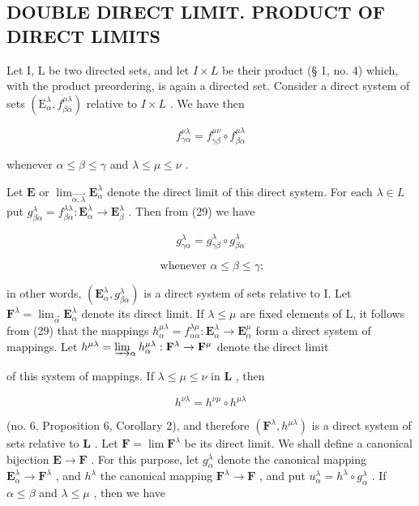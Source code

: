 \subsection{DOUBLE DIRECT LIMIT. PRODUCT OF DIRECT LIMITS}

Let I, L be two directed sets, and let \(I \times L\) be their product (§ 1, no. 4) which, with the product preordering, is again a directed set. Consider a direct system of sets \((\mathrm{E}_{\alpha}^{\lambda}, f_{\beta\alpha}^{\mu\lambda})\) relative to \(I \times L\) . We have then

\[
f _ {\gamma \alpha} ^ {\nu \lambda} = f _ {\gamma \beta} ^ {\mu \nu} \circ f _ {\beta \alpha} ^ {\mu \lambda}\tag{29}
\]

whenever \(\alpha \leqslant \beta \leqslant \gamma\) and \(\lambda \leqslant \mu \leqslant \nu\) .

Let \(\mathbf{E}\) or \(\lim_{\overrightarrow{\alpha, \lambda}} \mathbf{E}_{\alpha}^{\lambda}\) denote the direct limit of this direct system. For each \(\lambda \in L\) put \(g_{\beta \alpha}^{\lambda} = f_{\beta \alpha}^{\lambda \lambda}: \mathbf{E}_{\alpha}^{\lambda} \to \mathbf{E}_{\beta}^{\lambda}\) . Then from (29) we have

\[
g _ {\gamma \alpha} ^ {\lambda} = g _ {\gamma \beta} ^ {\lambda} \circ g _ {\beta \alpha} ^ {\lambda}\tag{30}
\]

\[
\text { whenever } \alpha \leqslant \beta \leqslant \gamma ;
\]

in other words, \((\mathbf{E}_{\alpha}^{\lambda}, g_{\beta \alpha}^{\lambda})\) is a direct system of sets relative to I. Let \(\mathbf{F}^{\lambda} = \lim_{\overrightarrow{\alpha}} \mathbf{E}_{\alpha}^{\lambda}\) denote its direct limit. If \(\lambda \leqslant \mu\) are fixed elements of L, it follows from (29) that the mappings \(h_{\alpha}^{\mu \lambda} = f_{\alpha \alpha}^{\lambda \mu}: \mathbf{E}_{\alpha}^{\lambda} \to \mathbf{E}_{\alpha}^{\mu}\) form a direct system of mappings. Let \(h^{\mu \lambda} = \varinjlim_{\alpha} h_{\alpha}^{\mu \lambda}: \mathbf{F}^{\lambda} \to \mathbf{F}^{\mu}\) denote the direct limit

of this system of mappings. If \(\lambda \leqslant \mu \leqslant \nu\) in \(\mathbf{L}\) , then

\[
h ^ {\nu \lambda} = h ^ {\nu \mu} \circ h ^ {\mu \lambda}\tag{31}
\]

(no. 6, Proposition 6, Corollary 2), and therefore \((\mathbf{F}^{\lambda}, h^{\mu \lambda})\) is a direct system of sets relative to \(\mathbf{L}\) . Let \(\mathbf{F} = \lim \mathbf{F}^{\lambda}\) be its direct limit. We shall define a canonical bijection \(\mathbf{E} \to \mathbf{F}\) . For this purpose, let \(g_{\alpha}^{\lambda}\) denote the canonical mapping \(\mathbf{E}_{\alpha}^{\lambda} \to \mathbf{F}^{\lambda}\) , and \(h^{\lambda}\) the canonical mapping \(\mathbf{F}^{\lambda} \to \mathbf{F}\) , and put \(u_{\alpha}^{\lambda} = h^{\lambda} \circ g_{\alpha}^{\lambda}\) . If \(\alpha \leqslant \beta\) and \(\lambda \leqslant \mu\) , then we have

